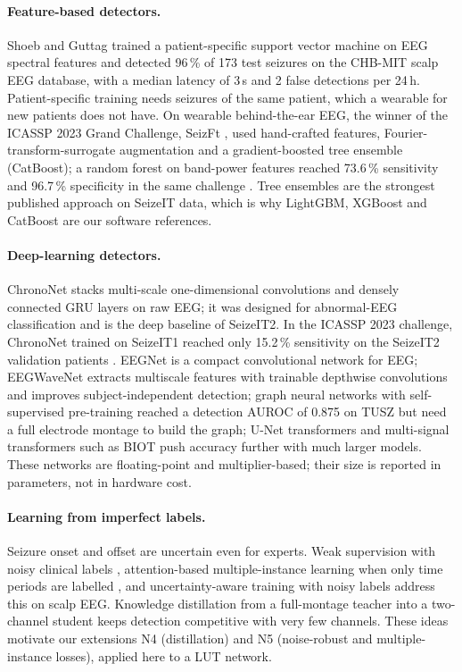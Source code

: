 \paragraph{Feature-based detectors.} Shoeb and Guttag \cite{shoeb2010icml} trained a patient-specific support vector
machine on EEG spectral features and detected 96\,\% of 173 test seizures on the CHB-MIT scalp EEG database, with a
median latency of 3\,s and 2 false detections per 24\,h. Patient-specific training needs seizures of the same patient,
which a wearable for new patients does not have. On wearable behind-the-ear EEG, the winner of the ICASSP 2023 Grand
Challenge, SeizFt \cite{alhussaini2023seizft}, used hand-crafted features, Fourier-transform-surrogate augmentation
and a gradient-boosted tree ensemble (CatBoost); a random forest on band-power features reached 73.6\,\% sensitivity
and 96.7\,\% specificity in the same challenge \cite{huang2023lightweight}. Tree ensembles are the strongest published
approach on SeizeIT data, which is why LightGBM, XGBoost and CatBoost are our software references.

\paragraph{Deep-learning detectors.} ChronoNet \cite{roy2019chrononet} stacks multi-scale one-dimensional convolutions
and densely connected GRU layers on raw EEG; it was designed for abnormal-EEG classification and is the deep baseline
of SeizeIT2. In the ICASSP 2023 challenge, ChronoNet trained on SeizeIT1 reached only 15.2\,\% sensitivity on the
SeizeIT2 validation patients \cite{huang2023lightweight}. EEGNet \cite{lawhern2018eegnet} is a compact convolutional
network for EEG; EEGWaveNet \cite{thuwajit2022eegwavenet} extracts multiscale features with trainable depthwise
convolutions and improves subject-independent detection; graph neural networks with self-supervised pre-training
\cite{tang2022gnnssl} reached a detection AUROC of 0.875 on TUSZ but need a full electrode montage to build the graph;
U-Net transformers \cite{wu2025seizuretransformer} and multi-signal transformers such as BIOT \cite{yang2023biot} push
accuracy further with much larger models. These networks are floating-point and multiplier-based; their size is
reported in parameters, not in hardware cost.

\paragraph{Learning from imperfect labels.} Seizure onset and offset are uncertain even for experts. Weak supervision
with noisy clinical labels \cite{saab2020weak}, attention-based multiple-instance learning when only time periods are
labelled \cite{isaev2020mil}, and uncertainty-aware training with noisy labels \cite{shama2026bundl} address this on
scalp EEG. Knowledge distillation from a full-montage teacher into a two-channel student \cite{zheng2023kdgnn} keeps
detection competitive with very few channels. These ideas motivate our extensions N4 (distillation) and N5
(noise-robust and multiple-instance losses), applied here to a LUT network.

